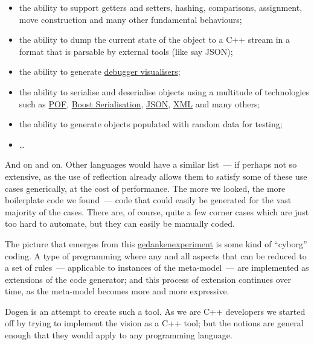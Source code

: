 \documentclass{book}
\begin{document}
\begin{itemize}
\item the ability to support getters and setters, hashing,
  comparisons, assignment, move construction and many other
  fundamental behaviours;
\item the ability to dump the current state of the object to a C++
  stream in a format that is parsable by external tools (like say
  JSON);
\item the ability to generate
  \href{http://stackoverflow.com/questions/5140475/how-to-write-native-c-debugger-visualizers-in-gdb-totalview-for-complicated-t}{debugger
    visualisers};
\item the ability to serialise and deserialise objects using a
  multitude of technologies such as
  \href{http://download.oracle.com/otn_hosted_doc/coherence/353CPP/index.html}{POF},
  \href{http://www.boost.org/doc/libs/1_55_0/libs/serialization/doc/index.html}{Boost
    Serialisation}, \href{https://github.com/hjiang/jsonxx}{JSON},
  \href{http://libxmlplusplus.sourceforge.net/}{XML} and many others;
\item the ability to generate objects populated with random data for
  testing;
\item \ldots{}
\end{itemize}

And on and on. Other languages would have a similar list~--- if
perhaps not so extensive, as the use of reflection already allows them
to satisfy some of these use cases generically, at the cost of
performance. The more we looked, the more boilerplate code we
found~--- code that could easily be generated for the vast majority of
the cases. There are, of course, quite a few corner cases which are
just too hard to automate, but they can easily be manually coded.

The picture that emerges from this
\href{http://en.wikipedia.org/wiki/Thought_experiment}{gedankenexperiment}
is some kind of ``cyborg'' coding. A type of programming where any and
all aspects that can be reduced to a set of rules~--- applicable to
instances of the meta-model~--- are implemented as extensions of the
code generator; and this process of extension continues over time, as
the meta-model becomes more and more expressive.

Dogen is an attempt to create such a tool. As we are C++ developers we
started off by trying to implement the vision as a C++ tool; but the
notions are general enough that they would apply to any programming
language.
\end{document}
